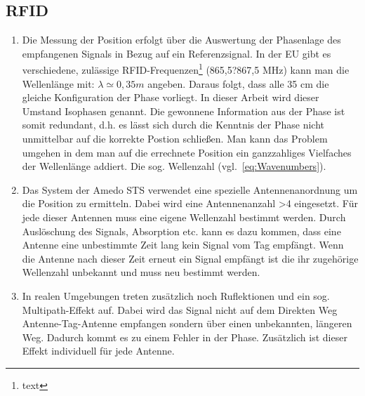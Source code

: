 \subsection{RFID}
\label{sec:Measurement1}
%
\begin{enumerate}
	\item Die Messung der Position erfolgt über die Auswertung der Phasenlage des empfangenen Signals in Bezug auf ein Referenzsignal. In der EU gibt es verschiedene, zulässige RFID-Frequenzen\footnote{text} (865,5?867,5 MHz) kann man die Wellenlänge mit: $ \lambda\simeq0,35 m $ angeben. Daraus folgt, dass alle 35 cm die gleiche Konfiguration der Phase vorliegt. In dieser Arbeit wird dieser Umstand Isophasen genannt. Die gewonnene Information aus der Phase ist somit redundant, d.h. es lässt sich durch die Kenntnis der Phase nicht unmittelbar auf die korrekte Postion schließen. Man kann das Problem umgehen in dem man auf die errechnete Position ein ganzzahliges Vielfaches der Wellenlänge addiert. Die sog. Wellenzahl (vgl.~\eqref{eq:Wavenumbers}).
	\item Das System der Amedo STS verwendet eine spezielle Antennenanordnung um die Position zu ermitteln. Dabei wird eine Antennenanzahl >4 eingesetzt. Für jede dieser Antennen muss eine eigene Wellenzahl bestimmt werden. Durch Auslöschung des Signals, Absorption etc. kann es dazu kommen, dass eine Antenne eine unbestimmte Zeit lang kein Signal vom Tag empfängt. Wenn die Antenne nach dieser Zeit erneut ein Signal empfängt ist die ihr zugehörige Wellenzahl unbekannt und muss neu bestimmt werden. 
	\item In realen Umgebungen treten zusätzlich noch Ruflektionen und ein sog. Multipath-Effekt auf. Dabei wird das Signal nicht auf dem Direkten Weg Antenne-Tag-Antenne empfangen sondern über einen unbekannten, längeren Weg. Dadurch kommt es zu einem Fehler in der Phase. Zusätzlich ist dieser Effekt individuell für jede Antenne.
\end{enumerate}
\lipsum[1-2]

%